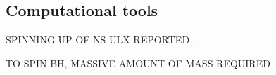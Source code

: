 \documentclass[letterpaper,12pt,onecolumn]{article}
\begin{document}
%

\subsection*{Computational tools}


SPINNING UP OF NS ULX REPORTED \citep{Christodoulou2017,Fuerst2018}.

TO SPIN BH, MASSIVE AMOUNT OF MASS REQUIRED


%
%

\newpage

\setlength{\bibsep}{5pt}
\scriptsize


\end{document}
